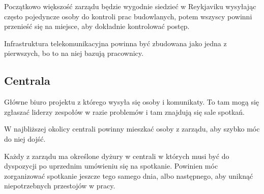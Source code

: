 Początkowo większość zarządu będzie wygodnie siedzieć w Reykjaviku wysyłając często pojedyncze osoby do kontroli prac budowlanych, potem wszyscy powinni przenieść się na miejsce, aby dokładnie kontrolować postęp.

Infrastruktura telekomunikacyjna powinna być zbudowana jako jedna z pierwszych, bo to na niej bazują pracownicy.

\subsection{Centrala}
Główne biuro projektu z którego wysyła się osoby i komunikaty.
To tam mogą się zgłaszać liderzy zespołów w razie problemów i tam znajdują się sale spotkań.

W najbliższej okolicy centrali powinny mieszkać osoby z zarządu, aby szybko móc do niej dojść.

Każdy z zarządu ma określone dyżury w centrali w których musi być do dyspozycji po uprzednim umówieniu się na spotkanie.
Powinien móc zorganizować spotkanie jeszcze tego samego dnia, albo następnego, aby uniknąć niepotrzebnych przestojów w pracy.